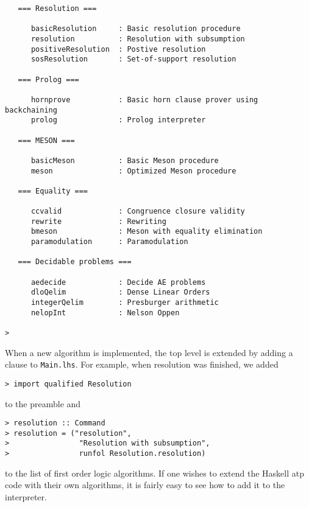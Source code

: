 \documentclass{article}
\begin{document}
\begin{verbatim}
   === Resolution ===
    
      basicResolution     : Basic resolution procedure
      resolution          : Resolution with subsumption
      positiveResolution  : Postive resolution
      sosResolution       : Set-of-support resolution
    
   === Prolog ===
    
      hornprove           : Basic horn clause prover using backchaining
      prolog              : Prolog interpreter
    
   === MESON ===
    
      basicMeson          : Basic Meson procedure
      meson               : Optimized Meson procedure
    
   === Equality ===
    
      ccvalid             : Congruence closure validity
      rewrite             : Rewriting
      bmeson              : Meson with equality elimination
      paramodulation      : Paramodulation
    
   === Decidable problems ===
    
      aedecide            : Decide AE problems
      dloQelim            : Dense Linear Orders
      integerQelim        : Presburger arithmetic
      nelopInt            : Nelson Oppen
 
> 
\end{verbatim} 

When a new algorithm is implemented, the top level is extended by adding
a clause to \texttt{Main.lhs}.  For example, when resolution was finished,
we added

\begin{verbatim} 
> import qualified Resolution
\end{verbatim} 

to the preamble and

\begin{verbatim} 
> resolution :: Command
> resolution = ("resolution",
>                "Resolution with subsumption",
>                runfol Resolution.resolution)
\end{verbatim} 

to the list of first order logic algorithms.  If one wishes to extend the 
Haskell atp code with their own algorithms, it is fairly easy to see how
to add it to the interpreter.
\end{document}
